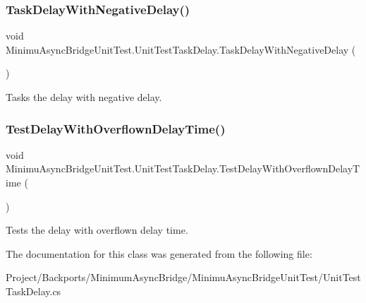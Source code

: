 \subsubsection{\texorpdfstring{Task\+Delay\+With\+Negative\+Delay()}{TaskDelayWithNegativeDelay()}}
{\footnotesize\ttfamily void Minimu\+Async\+Bridge\+Unit\+Test.\+Unit\+Test\+Task\+Delay.\+Task\+Delay\+With\+Negative\+Delay (\begin{DoxyParamCaption}{ }\end{DoxyParamCaption})\hspace{0.3cm}{\ttfamily [inline]}}



Tasks the delay with negative delay. 

\mbox{\label{class_minimu_async_bridge_unit_test_1_1_unit_test_task_delay_a9005a1a924aed71eefa9c136b80076d1}} 
\subsubsection{\texorpdfstring{Test\+Delay\+With\+Overflown\+Delay\+Time()}{TestDelayWithOverflownDelayTime()}}
{\footnotesize\ttfamily void Minimu\+Async\+Bridge\+Unit\+Test.\+Unit\+Test\+Task\+Delay.\+Test\+Delay\+With\+Overflown\+Delay\+Time (\begin{DoxyParamCaption}{ }\end{DoxyParamCaption})\hspace{0.3cm}{\ttfamily [inline]}}



Tests the delay with overflown delay time. 



The documentation for this class was generated from the following file\+:\begin{DoxyCompactItemize}
\item 
Project/\+Backports/\+Minimum\+Async\+Bridge/\+Minimu\+Async\+Bridge\+Unit\+Test/Unit\+Test\+Task\+Delay.\+cs\end{DoxyCompactItemize}
